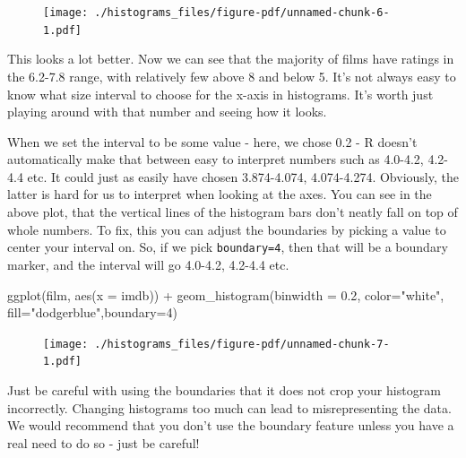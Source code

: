 \documentclass[
  letterpaper,
  DIV=11,
  numbers=noendperiod]{scrreprt}
\newenvironment{Shaded}{\begin{snugshade}}{\end{snugshade}}
\newcommand{\AttributeTok}[1]{\textcolor[rgb]{0.40,0.45,0.13}{#1}}
\newcommand{\DecValTok}[1]{\textcolor[rgb]{0.68,0.00,0.00}{#1}}
\newcommand{\FloatTok}[1]{\textcolor[rgb]{0.68,0.00,0.00}{#1}}
\newcommand{\FunctionTok}[1]{\textcolor[rgb]{0.28,0.35,0.67}{#1}}
\newcommand{\NormalTok}[1]{\textcolor[rgb]{0.00,0.23,0.31}{#1}}
\newcommand{\SpecialCharTok}[1]{\textcolor[rgb]{0.37,0.37,0.37}{#1}}
\newcommand{\StringTok}[1]{\textcolor[rgb]{0.13,0.47,0.30}{#1}}
\begin{document}
\begin{figure}[H]

{\centering \texttt{[image: ./histograms\_files/figure-pdf/unnamed-chunk-6-1.pdf]}

}

\end{figure}

This looks a lot better. Now we can see that the majority of films have
ratings in the 6.2-7.8 range, with relatively few above 8 and below 5.
It's not always easy to know what size interval to choose for the x-axis
in histograms. It's worth just playing around with that number and
seeing how it looks.

When we set the interval to be some value - here, we chose 0.2 - R
doesn't automatically make that between easy to interpret numbers such
as 4.0-4.2, 4.2-4.4 etc. It could just as easily have chosen
3.874-4.074, 4.074-4.274. Obviously, the latter is hard for us to
interpret when looking at the axes. You can see in the above plot, that
the vertical lines of the histogram bars don't neatly fall on top of
whole numbers. To fix, this you can adjust the boundaries by picking a
value to center your interval on. So, if we pick \texttt{boundary=4},
then that will be a boundary marker, and the interval will go 4.0-4.2,
4.2-4.4 etc.

\begin{Shaded}
\begin{Highlighting}[]
\FunctionTok{ggplot}\NormalTok{(film, }\FunctionTok{aes}\NormalTok{(}\AttributeTok{x =}\NormalTok{ imdb)) }\SpecialCharTok{+} 
  \FunctionTok{geom\_histogram}\NormalTok{(}\AttributeTok{binwidth =} \FloatTok{0.2}\NormalTok{, }\AttributeTok{color=}\StringTok{"white"}\NormalTok{, }\AttributeTok{fill=}\StringTok{"dodgerblue"}\NormalTok{,}\AttributeTok{boundary=}\DecValTok{4}\NormalTok{) }
\end{Highlighting}
\end{Shaded}

\begin{figure}[H]

{\centering \texttt{[image: ./histograms\_files/figure-pdf/unnamed-chunk-7-1.pdf]}

}

\end{figure}

Just be careful with using the boundaries that it does not crop your
histogram incorrectly. Changing histograms too much can lead to
misrepresenting the data. We would recommend that you don't use the
boundary feature unless you have a real need to do so - just be careful!
\end{document}
